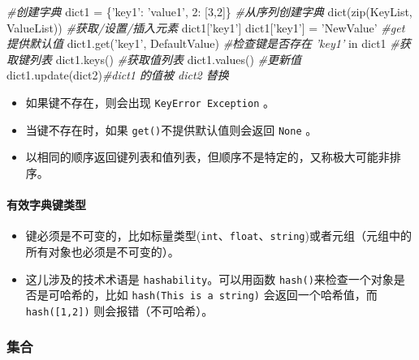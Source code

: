 \documentclass[]{ctexart}
\newenvironment{Shaded}{}{}
\newcommand{\DecValTok}[1]{\textcolor[rgb]{0.25,0.63,0.44}{{#1}}}
\newcommand{\StringTok}[1]{\textcolor[rgb]{0.25,0.44,0.63}{{#1}}}
\newcommand{\CommentTok}[1]{\textcolor[rgb]{0.38,0.63,0.69}{\textit{{#1}}}}
\newcommand{\OperatorTok}[1]{\textcolor[rgb]{0.40,0.40,0.40}{{#1}}}
\newcommand{\BuiltInTok}[1]{{#1}}
\newcommand{\NormalTok}[1]{{#1}}
\let\oldparagraph\paragraph
\renewcommand{\paragraph}[1]{\oldparagraph{#1}\mbox{}}
\begin{document}
\begin{Shaded}
\begin{Highlighting}[]
\CommentTok{#创建字典}
\NormalTok{dict1 }\OperatorTok{=} \NormalTok{\{}\StringTok{'key1'}\NormalTok{: }\StringTok{'value1'}\NormalTok{, }\DecValTok{2}\NormalTok{: [}\DecValTok{3}\NormalTok{,}\DecValTok{2}\NormalTok{]\}}
\CommentTok{#从序列创建字典}
\BuiltInTok{dict}\NormalTok{(}\BuiltInTok{zip}\NormalTok{(KeyList, ValueList))}
\CommentTok{#获取/设置/插入元素}
\NormalTok{dict1[}\StringTok{'key1'}\NormalTok{]}
\NormalTok{dict1[}\StringTok{'key1'}\NormalTok{] }\OperatorTok{=} \StringTok{'NewValue'}
\CommentTok{#get 提供默认值}
\NormalTok{dict1.get(}\StringTok{'key1'}\NormalTok{, DefaultValue)}
\CommentTok{#检查键是否存在}
\CommentTok{'key1'} \OperatorTok{in} \NormalTok{dict1}
\CommentTok{#获取键列表}
\NormalTok{dict1.keys()}
\CommentTok{#获取值列表}
\NormalTok{dict1.values()}
\CommentTok{#更新值}
\NormalTok{dict1.update(dict2)}\CommentTok{#dict1 的值被 dict2 替换}
\end{Highlighting}
\end{Shaded}

\begin{itemize}
\item
  如果键不存在，则会出现 \texttt{KeyError\ Exception} 。
\item
  当键不存在时，如果 \texttt{get()}不提供默认值则会返回 \texttt{None} 。
\item
  以相同的顺序返回键列表和值列表，但顺序不是特定的，又称极大可能非排序。
\end{itemize}

\paragraph{有效字典键类型}\label{header-n181}

\begin{itemize}
\item
  键必须是不可变的，比如标量类型(\texttt{int}、\texttt{float}、\texttt{string})或者元组（元组中的所有对象也必须是不可变的）。
\item
  这儿涉及的技术术语是 \texttt{hashability}。可以用函数
  \texttt{hash()}来检查一个对象是否是可哈希的，比如
  \texttt{hash(\textquotesingle{}This\ is\ a\ string\textquotesingle{})}
  会返回一个哈希值，而 \texttt{hash({[}1,2{]})} 则会报错（不可哈希）。
\end{itemize}

\subsubsection{集合}\label{header-n189}
\end{document}

